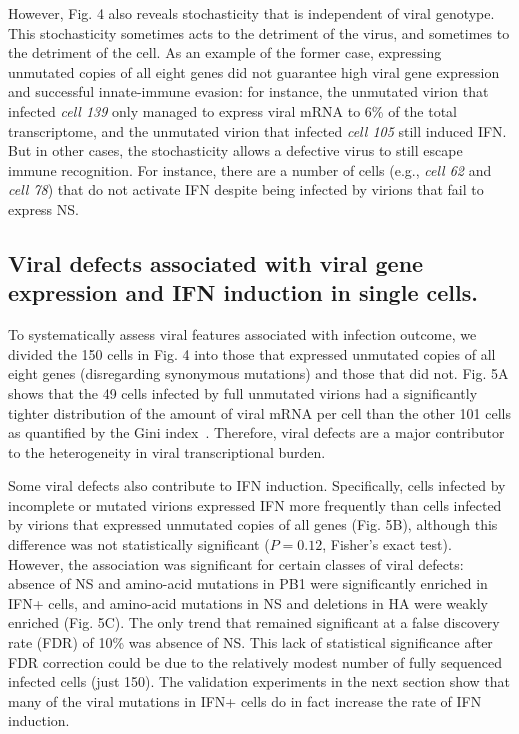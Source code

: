 \documentclass[]{article}
\begin{document}
However, Fig. 4 also reveals stochasticity that is independent of viral genotype.
This stochasticity sometimes acts to the detriment of the virus, and sometimes to the detriment of the cell.
As an example of the former case, expressing unmutated copies of all eight genes did not guarantee high viral gene expression and successful innate-immune evasion: for instance, the unmutated virion that infected \textit{cell 139} only managed to express viral mRNA to 6\% of the total transcriptome, and the unmutated virion that infected \textit{cell 105} still induced IFN.
But in other cases, the stochasticity allows a defective virus to still escape immune recognition.
For instance, there are a number of cells (e.g., \textit{cell 62} and \textit{cell 78}) that do not activate IFN despite being infected by virions that fail to express NS.

\subsection*{Viral defects associated with viral gene expression and IFN induction in single cells.}

To systematically assess viral features associated with infection outcome, we divided the 150 cells in Fig. 4 into those that expressed unmutated copies of all eight genes (disregarding synonymous mutations) and those that did not.
Fig. 5A shows that the 49 cells infected by full unmutated virions had a significantly tighter distribution of the amount of viral mRNA per cell than the other 101 cells as quantified by the Gini index~\cite{gini1921measurement}.
Therefore, viral defects are a major contributor to the heterogeneity in viral transcriptional burden.

Some viral defects also contribute to IFN induction.
Specifically, cells infected by incomplete or mutated virions expressed IFN more frequently than cells infected by virions that expressed unmutated copies of all genes (Fig. 5B), although this difference was not statistically significant ($P = 0.12$, Fisher's exact test).
However, the association was significant for certain classes of viral defects: absence of NS and amino-acid mutations in PB1 were significantly enriched in IFN+ cells, and amino-acid mutations in NS and deletions in HA were weakly enriched (Fig. 5C).
The only trend that remained significant at a false discovery rate (FDR) of 10\% was absence of NS.
This lack of statistical significance after FDR correction could be due to the relatively modest number of fully sequenced infected cells (just 150).
The validation experiments in the next section show that many of the viral mutations in IFN+ cells do in fact increase the rate of IFN induction.
\end{document}
